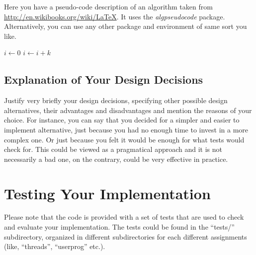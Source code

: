 Here you have a pseudo-code description of an algorithm taken from \\ \href{http://en.wikibooks.org/wiki/LaTeX/Algorithms\_and\_Pseudocode\#Typesetting\_using\_the\_program\_package}{http://en.wikibooks.org/wiki/LaTeX}. It uses the \textit{algpseudocode} package. Alternatively, you can use any other package and environment of same sort you like. 


\begin{algorithmic}
    \State $i\gets 0$
\Else
        \State $i\gets i+k$
    \EndIf
\EndIf
\end{algorithmic}

\subsection{Explanation of Your Design Decisions}

Justify very briefly your design decisions, specifying other possible design alternatives, their advantages and disadvantages and mention the reasons of your choice. For instance, you can say that you decided for a simpler and easier to implement alternative, just because you had no enough time to invest in a more complex one. Or just because you felt it would be enough for what \OSName{} tests would check for. This could be viewed as a pragmatical approach and it is not necessarily a bad one, on the contrary, could be very effective in practice.  


\section{Testing Your Implementation}

Please note that the \OSName{} code is provided with a set of tests that are used to check and evaluate your implementation. The \OSName{} tests could be found in the ``tests/'' subdirectory, organized in different subdirectories for each different assignments (like, ``threads'', ``userprog'' etc.).

